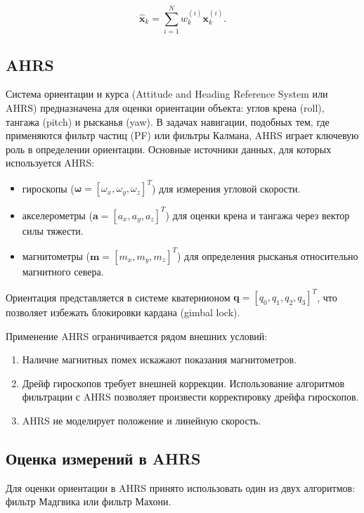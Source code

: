 \begin{equation}
    \hat{\mathbf{x}}_k = \sum_{i=1}^N w_k^{(i)} \mathbf{x}_k^{(i)}.
\end{equation}

\subsection{AHRS}
\label{subsec:ahrs}

Система ориентации и курса (Attitude and Heading Reference System или AHRS) предназначена для оценки
ориентации объекта: углов крена (roll), тангажа (pitch) и рысканья (yaw).
В задачах навигации, подобных тем, где применяются фильтр частиц (PF) или фильтры Калмана,
AHRS играет ключевую роль в определении ориентации.
Основные источники данных, для которых используется AHRS: 
\begin{itemize}
    \item гироскопы (\(\boldsymbol{\omega} = [\omega_x, \omega_y, \omega_z]^T\)) для измерения угловой скорости.
    \item акселерометры (\(\mathbf{a} = [a_x, a_y, a_z]^T\)) для оценки крена и тангажа через вектор силы тяжести.
    \item магнитометры (\(\mathbf{m} = [m_x, m_y, m_z]^T\)) для определения рысканья относительно магнитного севера.
\end{itemize}

Ориентация представляется в системе кватернионом \(\mathbf{q} = [q_0, q_1, q_2, q_3]^T\), что позволяет
избежать блокировки кардана (gimbal lock).

Применение AHRS ограничивается рядом внешних условий:

\begin{enumerate}[label=\arabic*]
    \item Наличие магнитных помех искажают показания магнитометров.
    \item Дрейф гироскопов требует внешней коррекции. Использование алгоритмов фильтрации
	    с AHRS позволяет произвести корректировку дрейфа гироскопов.
    \item AHRS не моделирует положение и линейную скорость.
\end{enumerate}

\subsection{Оценка измерений в AHRS}

Для оценки ориентации в AHRS принято использовать один из двух алгоритмов: фильтр Мадгвика или фильтр Махони.


